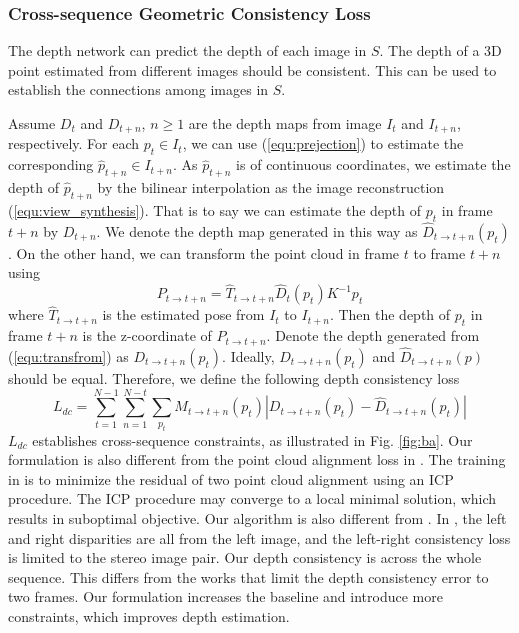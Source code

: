 \documentclass[10pt,twocolumn,letterpaper]{article}
\begin{document}
\subsubsection{Cross-sequence Geometric Consistency Loss}
The depth network can predict the depth of each image in $S$. The depth of a 3D point estimated from different images should be consistent. This can be used to establish the connections among images in $S$.

Assume ${{D}_{t}}$ and ${{D}_{t+n}}$, $n\ge 1$ are the depth maps from image ${{I}_{t}}$ and ${{I}_{t+n}}$, respectively. For each ${{p}_{t}}\in {{I}_{t}}$, we can use (\ref{equ:prejection}) to estimate the corresponding ${{\hat{p}}_{t+n}}\in {{I}_{t+n}}$. As ${{\hat{p}}_{t+n}}$ is of continuous coordinates, we estimate the depth of ${{\hat{p}}_{t+n}}$ by the bilinear interpolation as the image reconstruction (\ref{equ:view_synthesis}). That is to say we can estimate the  depth of ${{p}_{t}}$ in frame $t+n$ by ${{D}_{t+n}}$. We denote the depth map generated in this way as ${{\hat{D}}_{t\to t+n}}\left( p_t \right)$. On the other hand, we can transform the point cloud in frame $t$ to frame $t+n$ using 
\begin{equation} \label{equ:transfrom}
	{P_{t \to t + n}} = {\hat T_{t \to t + n}}{\hat D_t}\left( {{p_t}} \right){K^{ - 1}}{p_t}
\end{equation} 
where ${{\hat{T}}_{t\to t+n}}$ is the estimated pose from ${{I}_{t}}$ to ${{I}_{t+n}}$. Then the depth of ${p_t}$ in frame $t+n$ is the z-coordinate of ${{P}_{t\to t+n}}$. Denote the depth generated from (\ref{equ:transfrom}) as ${{D}_{t\to t+n}}\left( {{p}_{t}} \right)$.  Ideally, ${{D}_{t\to t+n}}\left( {{p}_{t}} \right)$ and ${{\hat{D}}_{t\to t+n}}\left( p \right)$ should be equal. Therefore, we define the following depth consistency loss
\begin{equation} \label{equ:gcl}
	{L_{dc}} = \sum\limits_{t = 1}^{N - 1} {\sum\limits_{n = 1}^{N - t} {\sum\limits_{{p_t}} {{M_{t \to t + n}}({p_t})} \left| {{D_{t \to t + n}}({p_t}) - {{\hat D}_{t \to t + n}}({p_t})} \right|} }
\end{equation}
${{L}_{dc}}$ establishes cross-sequence constraints, as illustrated in Fig. \ref{fig:ba}. Our formulation is also different from the point cloud alignment loss in \cite{mahjourian2018unsupervised}. The training in \cite{mahjourian2018unsupervised} is to minimize the residual of two point cloud alignment using an ICP procedure. The ICP procedure may converge to a local minimal solution, which results in suboptimal objective. Our algorithm is also different from \cite{godard2017unsupervised}. In \cite{godard2017unsupervised}, the left and right disparities are all from the left image, and the left-right consistency loss is limited to the stereo image pair. Our depth consistency is across the whole sequence. This differs from the works \cite{vijayanarasimhan2017sfm,zou2018df} that limit the depth consistency error to two frames. Our formulation increases the baseline and introduce more constraints, which improves depth estimation.
\end{document}
